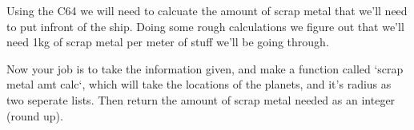 \documentclass{article}
\begin{document}
Using the C64 we will need to calcuate the amount of scrap metal that we'll need to put infront of the ship. Doing some rough calculations we figure out that we'll need 1kg of scrap metal per meter of stuff we'll be going through.

Now your job is to take the information given, and make a function called `scrap metal amt calc`, which will take the locations of the planets, and it's radius as two seperate lists. Then return the amount of scrap metal needed as an integer (round up).
\end{document}
